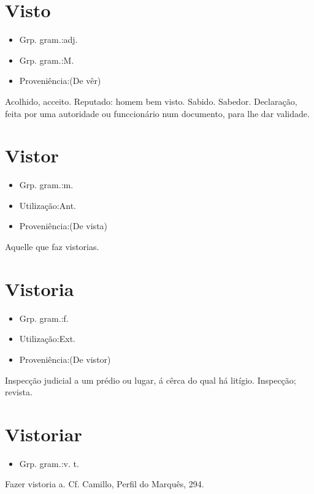 \documentclass{article}
\begin{document}
\section{Visto}
\begin{itemize}
\item {Grp. gram.:adj.}
\end{itemize}
\begin{itemize}
\item {Grp. gram.:M.}
\end{itemize}
\begin{itemize}
\item {Proveniência:(De \textunderscore vêr\textunderscore )}
\end{itemize}
Acolhido, acceito.
Reputado: \textunderscore homem bem visto\textunderscore .
Sabido.
Sabedor.
Declaração, feita por uma autoridade ou funccionário num documento, para lhe dar validade.
\section{Vistor}
\begin{itemize}
\item {Grp. gram.:m.}
\end{itemize}
\begin{itemize}
\item {Utilização:Ant.}
\end{itemize}
\begin{itemize}
\item {Proveniência:(De \textunderscore vista\textunderscore )}
\end{itemize}
Aquelle que faz vistorias.
\section{Vistoria}
\begin{itemize}
\item {Grp. gram.:f.}
\end{itemize}
\begin{itemize}
\item {Utilização:Ext.}
\end{itemize}
\begin{itemize}
\item {Proveniência:(De \textunderscore vistor\textunderscore )}
\end{itemize}
Inspecção judicial a um prédio ou lugar, á cêrca do qual há litígio.
Inspecção; revista.
\section{Vistoriar}
\begin{itemize}
\item {Grp. gram.:v. t.}
\end{itemize}
Fazer vistoria a. Cf. Camillo, \textunderscore Perfil do Marquês\textunderscore , 294.
\end{document}
